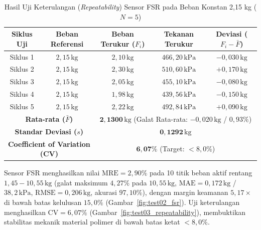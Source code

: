 \begin{table}[htbp]
\centering
\caption{Hasil Uji Keterulangan (\textit{Repeatability}) Sensor FSR pada Beban Konstan 2,15 kg ($N=5$)}
\label{tab:test03_repeatability_results}
\small
\setlength{\tabcolsep}{5pt}
\begin{tabular}{|c|c|c|c|c|}
\hline
\textbf{Siklus Uji} & \textbf{Beban Referensi} & \textbf{Beban Terukur ($F_i$)} & \textbf{Tekanan Terukur} & \textbf{Deviasi ($F_i - \bar{F}$)} \\ \hline
Siklus 1 & $2{,}15\,\mathrm{kg}$ & $2{,}10\,\mathrm{kg}$ & $466{,}20\,\mathrm{kPa}$ & $-0{,}030\,\mathrm{kg}$ \\ \hline
Siklus 2 & $2{,}15\,\mathrm{kg}$ & $2{,}30\,\mathrm{kg}$ & $510{,}60\,\mathrm{kPa}$ & $+0{,}170\,\mathrm{kg}$ \\ \hline
Siklus 3 & $2{,}15\,\mathrm{kg}$ & $2{,}05\,\mathrm{kg}$ & $455{,}10\,\mathrm{kPa}$ & $-0{,}080\,\mathrm{kg}$ \\ \hline
Siklus 4 & $2{,}15\,\mathrm{kg}$ & $1{,}98\,\mathrm{kg}$ & $439{,}56\,\mathrm{kPa}$ & $-0{,}150\,\mathrm{kg}$ \\ \hline
Siklus 5 & $2{,}15\,\mathrm{kg}$ & $2{,}22\,\mathrm{kg}$ & $492{,}84\,\mathrm{kPa}$ & $+0{,}090\,\mathrm{kg}$ \\ \hline
\multicolumn{2}{|c|}{\textbf{Rata-rata ($\bar{F}$)}} & \multicolumn{3}{c|}{$\mathbf{2{,}1300\,\mathrm{kg}}$ (Galat Rata-rata: $-0{,}020\,\mathrm{kg}$ / $0{,}93\%$)} \\ \hline
\multicolumn{2}{|c|}{\textbf{Standar Deviasi ($s$)}} & \multicolumn{3}{c|}{$\mathbf{0{,}1292\,\mathrm{kg}}$} \\ \hline
\multicolumn{2}{|c|}{\textbf{Coefficient of Variation (CV)}} & \multicolumn{3}{c|}{$\mathbf{6{,}07\%}$ (Target: $< 8{,}0\%$)} \\ \hline
\end{tabular}
\end{table}

Sensor FSR menghasilkan nilai $\mathrm{MRE} = 2{,}90\%$ pada 10 titik beban aktif rentang $1{,}45 - 10{,}55\,\mathrm{kg}$ (galat maksimum $4{,}27\%$ pada $10{,}55\,\mathrm{kg}$, $\mathrm{MAE} = 0{,}172\,\mathrm{kg}$ / $38{,}2\,\mathrm{kPa}$, $\mathrm{RMSE} = 0{,}206\,\mathrm{kg}$, akurasi $97{,}10\%$), dengan margin keamanan $5{,}17\times$ di bawah batas kelulusan $15{,}0\%$ (Gambar~\ref{fig:test02_fsr}). Uji keterulangan menghasilkan $\mathrm{CV} = 6{,}07\%$ (Gambar~\ref{fig:test03_repeatability}), membuktikan stabilitas mekanik material polimer di bawah batas ketat $< 8{,}0\%$.

